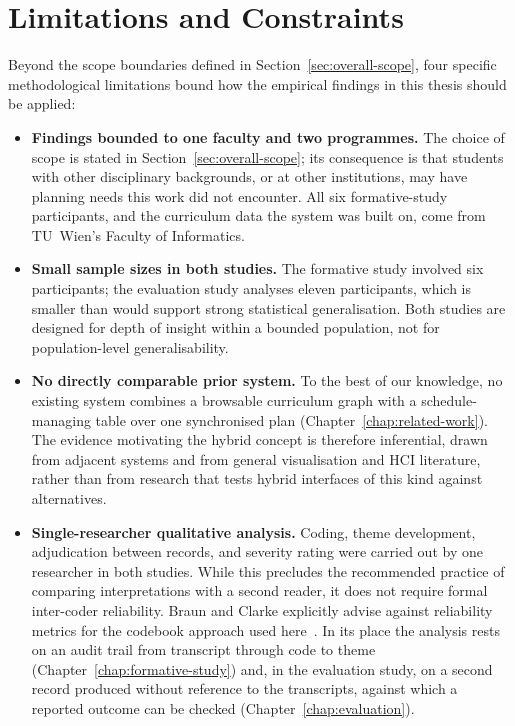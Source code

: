 \section{Limitations and Constraints}
\label{sec:overall-scope-detail}

Beyond the scope boundaries defined in Section~\ref{sec:overall-scope}, four specific methodological limitations bound how the empirical findings in this thesis should be applied:

\begin{itemize}
    \item \textbf{Findings bounded to one faculty and two programmes.} The choice of scope is stated in Section~\ref{sec:overall-scope}; its consequence is that students with other disciplinary backgrounds, or at other institutions, may have planning needs this work did not encounter. All six formative-study participants, and the curriculum data the system was built on, come from TU~Wien's Faculty of Informatics.
    \item \textbf{Small sample sizes in both studies.} The formative study involved six participants; the evaluation study analyses eleven participants, which is smaller than would support strong statistical generalisation. Both studies are designed for depth of insight within a bounded population, not for population-level generalisability.
    \item \textbf{No directly comparable prior system.} To the best of our knowledge, no existing system combines a browsable curriculum graph with a schedule-managing table over one synchronised plan (Chapter~\ref{chap:related-work}). The evidence motivating the hybrid concept is therefore inferential, drawn from adjacent systems and from general visualisation and HCI literature, rather than from research that tests hybrid interfaces of this kind against alternatives.
    \item \textbf{Single-researcher qualitative analysis.} Coding, theme development, adjudication between records, and severity rating were carried out by one researcher in both studies. While this precludes the recommended practice of comparing interpretations with a second reader, it does not require formal inter-coder reliability. Braun and Clarke explicitly advise against reliability metrics for the codebook approach used here~\cite[pp.~236, 241]{braun_thematic_2022}. In its place the analysis rests on an audit trail from transcript through code to theme (Chapter~\ref{chap:formative-study}) and, in the evaluation study, on a second record produced without reference to the transcripts, against which a reported outcome can be checked (Chapter~\ref{chap:evaluation}).
\end{itemize}

